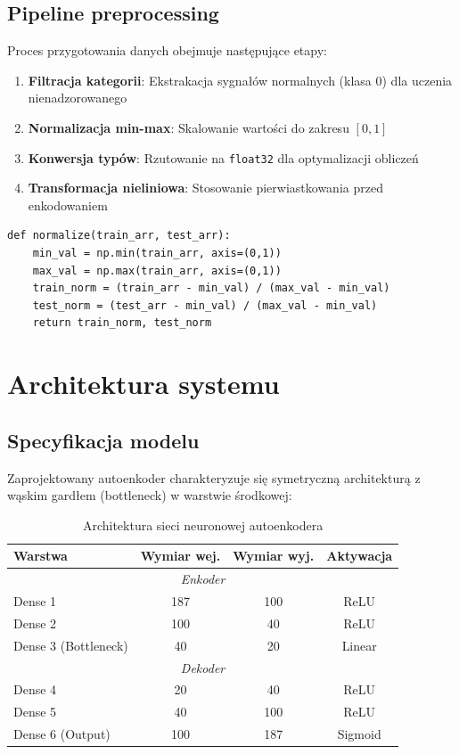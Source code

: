 \documentclass[12pt,a4paper]{article}
\begin{document}
\subsection{Pipeline preprocessing}

Proces przygotowania danych obejmuje następujące etapy:

\begin{enumerate}
    \item \textbf{Filtracja kategorii}: Ekstrakacja sygnałów normalnych (klasa 0) dla uczenia nienadzorowanego
    \item \textbf{Normalizacja min-max}: Skalowanie wartości do zakresu $[0,1]$
    \item \textbf{Konwersja typów}: Rzutowanie na \texttt{float32} dla optymalizacji obliczeń
    \item \textbf{Transformacja nieliniowa}: Stosowanie pierwiastkowania przed enkodowaniem
\end{enumerate}

\begin{lstlisting}[caption=Funkcja normalizacji danych]
def normalize(train_arr, test_arr):
    min_val = np.min(train_arr, axis=(0,1))
    max_val = np.max(train_arr, axis=(0,1))
    train_norm = (train_arr - min_val) / (max_val - min_val)
    test_norm = (test_arr - min_val) / (max_val - min_val)
    return train_norm, test_norm
\end{lstlisting}

\section{Architektura systemu}

\subsection{Specyfikacja modelu}

Zaprojektowany autoenkoder charakteryzuje się symetryczną architekturą z wąskim gardłem (bottleneck) w warstwie środkowej:

\begin{table}[H]
\centering
\begin{tabular}{@{}lccc@{}}
\toprule
\textbf{Warstwa} & \textbf{Wymiar wej.} & \textbf{Wymiar wyj.} & \textbf{Aktywacja} \\
\midrule
\multicolumn{4}{c}{\textit{Enkoder}} \\
\midrule
Dense 1 & 187 & 100 & ReLU \\
Dense 2 & 100 & 40 & ReLU \\
Dense 3 (Bottleneck) & 40 & 20 & Linear \\
\midrule
\multicolumn{4}{c}{\textit{Dekoder}} \\
\midrule
Dense 4 & 20 & 40 & ReLU \\
Dense 5 & 40 & 100 & ReLU \\
Dense 6 (Output) & 100 & 187 & Sigmoid \\
\bottomrule
\end{tabular}
\caption{Architektura sieci neuronowej autoenkodera}
\end{table}
\end{document}
